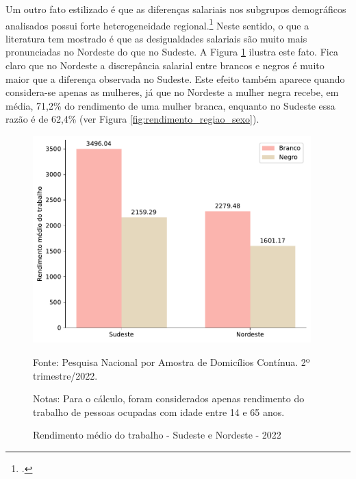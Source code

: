 \documentclass[12pt]{article}
\begin{document}
\par Um outro fato estilizado é que as diferenças salariais nos subgrupos de\-mo\-grá\-fi\-cos analisados possui forte heterogeneidade regional.\footcite{campante2004desigualdade} Neste sentido, o que a literatura tem mostrado é que as desigualdades salariais são muito mais pronunciadas no Nordeste do que no Sudeste. A Figura \ref{fig:rendimento_regiao} ilustra este fato. Fica claro que no Nordeste a discrepância salarial entre brancos e negros é muito maior que a diferença observada no Sudeste. Este efeito também aparece quando considera-se apenas as mulheres, já que no Nordeste a mulher negra recebe, em média, 71,2\% do rendimento de uma mulher branca, enquanto no Sudeste essa razão é de 62,4\% (ver Figura \ref{fig:rendimento_regiao_sexo}).


\begin{figure}[H]
    \centering
    \caption{Rendimento médio do trabalho - Sudeste e Nordeste - 2022}
        \includegraphics[height=8cm]{../figures/wage_2002_region.pdf}
    \label{fig:rendimento_regiao}
    \begin{floatnotes}
        \item[Fonte:] Pesquisa Nacional por Amostra de Domicílios Contínua. 2º trimestre/2022.
        \item[Notas:] Para o cálculo, foram considerados apenas rendimento do trabalho de pessoas ocupadas com idade entre 14 e 65 anos.
    \end{floatnotes}
\end{figure}
\end{document}

